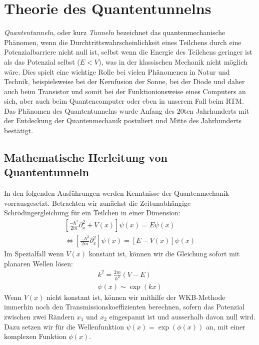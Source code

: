 \section{Theorie des Quantentunnelns}
\textit{Quantentunneln}, oder kurz \textit{Tunneln} 
bezeichnet das quantenmechanische Phänomen, wenn 
die Durchtrittswahrscheinlichkeit eines Teilchens
durch eine Potenzialbarriere nicht null ist, selbst wenn die Energie
des Teilchens geringer ist als das Potenzial selbst ($E < V$), was
in der klassischen Mechanik nicht möglich wäre. Dies
spielt eine wichtige Rolle bei
vielen Phänomenen in Natur und Technik,
beispielsweise bei der Kernfusion der Sonne, bei der Diode und
daher auch beim Transistor und somit bei der Funktionionsweise
eines Computers an sich, aber auch beim Quantencomputer oder
eben in unserem Fall beim RTM. Das Phänomen des Quantentunnelns
wurde Anfang des 20ten Jahrhunderts mit der Entdeckung der 
Quantenmechanik postuliert und Mitte des Jahrhunderts bestätigt.
\subsection{Mathematische Herleitung von Quantentunneln}
In den folgenden Ausführungen werden Kenntnisse der Quantenmechanik
vorrausgesetzt. Betrachten wir zunächst die Zeitunabhängige
Schrödingergleichung für ein Teilchen in einer Dimension:
\begin{align}
\left [ \frac{-\hbar^2}{2m}\partial_x^2 + V(x) \right ]\psi(x) = E\psi(x) \\ 
\Leftrightarrow \left [ \frac{-\hbar^2}{2m}\partial_x^2 \right ]\psi(x) = \left [E-V(x) \right ]\psi(x) 
\end{align}
Im Spezialfall wenn $V(x)$ konstant ist, können wir die Gleichung
sofort mit planaren Wellen lösen:
\begin{align}
    k^2 = \frac{2m}{\hbar^2}(V-E)\\
    \psi(x) \sim \exp(kx) 
\end{align}
Wenn $V(x)$ nicht konstant ist, können wir mithilfe der WKB-Methode 
\cite{froman1970transmission}
immerhin noch den Transmissionskoeffizienten berechnen, sofern
das Potenzial zwischen zwei Rändern $x_1$ und $x_2$ eingespannt ist 
und ausserhalb davon null wird. Dazu setzen wir für die 
Wellenfunktion $\psi(x)=\exp(\phi(x))$ an, 
mit einer komplexen Funktion $\phi(x)$. 

